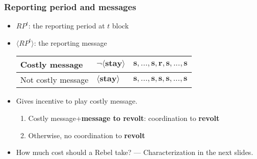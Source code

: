 \documentclass[9pt]{beamer}
\begin{document}
\begin{frame}
\frametitle{Reporting period and messages}



\begin{itemize}
\item $RP^t$: the reporting period at $t$ block

\item $\langle RP^t \rangle$: the reporting message
\begin{table}[h]
\begin{tabular}{l l l}
\alert{Costly message} & $\neg\langle \textbf{stay} \rangle$ & $\textbf{s},...,\textbf{s},{\textbf{r},\textbf{s},...,\textbf{s}}$ \\
\hline
\alert{Not costly message} & $\langle \textbf{stay} \rangle$ & $\textbf{s},...,\textbf{s},\textbf{s},\textbf{s},...,\textbf{s}$  \\

\end{tabular}
\end{table}

\pause
\item Gives incentive to play costly message.
\begin{enumerate}
\item {Costly message}+\textbf{message to revolt}: coordination to \textbf{revolt}

\item Otherwise, no coordination to \textbf{revolt}


\end{enumerate}

\pause

\item How much cost should a Rebel take? --- Characterization in the next slides.

\end{itemize}








\end{frame}
\end{document}
